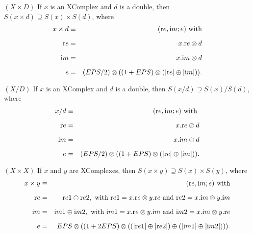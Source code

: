 \begin{proposition}\label{GMT 7.8}{$(X  \times  D)$} 
If $x$ is an {\textrm XComplex} and $d$ is a double{\textrm ,} then 
$S(x \times d) \supseteq S(x) \times S(d)${\textrm ,} where
\begin{eqnarray*}
x \times d &\equiv& ({\mathrm re},{\mathrm im};e) \hbox{ with}\\[6pt] {\mathrm re} &= &x.{\mathrm re} \otimes d\\[6pt] {\mathrm im} &= &x.{\mathrm im} \otimes d\\[6pt] e &=& (EPS/2) \otimes ((1 + EPS) \otimes (|{\mathrm re}| \oplus |{\mathrm im}|) ). \end{eqnarray*}
\end{proposition}

\begin{proposition}\label{GMT 7.9}{$(X / D)$} 
If $x$ is an {\textrm XComplex} and $d$ is a double{\textrm ,} then 
$S(x / d) \supseteq S(x) / S(d)${\textrm ,} where
\begin{eqnarray*}
x / d& \equiv& ({\mathrm re},{\mathrm im};e) \hbox{ with }\\[6pt] {\mathrm re}& =& x.{\mathrm re} \oslash d\\[6pt] {\mathrm im} &= &x.{\mathrm im} \oslash d\\[6pt] e& = &(EPS/2) \otimes ((1 + EPS) \otimes (|{\mathrm re}| \oplus |{\mathrm im}|) ).
\end{eqnarray*}
\end{proposition}

\begin{proposition}\label{GMT 7.10}{$(X  \times  X)$}
If $x$ and $y$ are {\textrm XComplexes,} then 
$S(x \times y) \supseteq S(x) \times S(y)${\textrm ,} where
\begin{eqnarray*}
x \times y &\equiv& ({\mathrm re},{\mathrm im};e)\hbox{ with}\\[6pt] {\mathrm re}& =&{\mathrm  re}1 \ominus {\mathrm re2}, \hbox{ with ${\mathrm re1} = x.{\mathrm re} \otimes y.{\mathrm re}$ and ${\mathrm re}2 =
x.{\mathrm im} \otimes y.{\mathrm im}$} \\[6pt] {\mathrm im}& =& {\mathrm im}1 \oplus {\mathrm im}2, \hbox{ with ${\mathrm im}1 = x.{\mathrm re} \otimes y.{\mathrm im}$ and ${\mathrm im}2 = x.{\mathrm im} \otimes
y.{\mathrm re}$}\\[6pt] e& =& EPS \otimes ((1 + 2EPS) \otimes  ((|{\mathrm re}1| \oplus |{\mathrm re}2|) \oplus  (|{\mathrm im}1| \oplus |{\mathrm im}2|))).
\end{eqnarray*}
\end{proposition}

